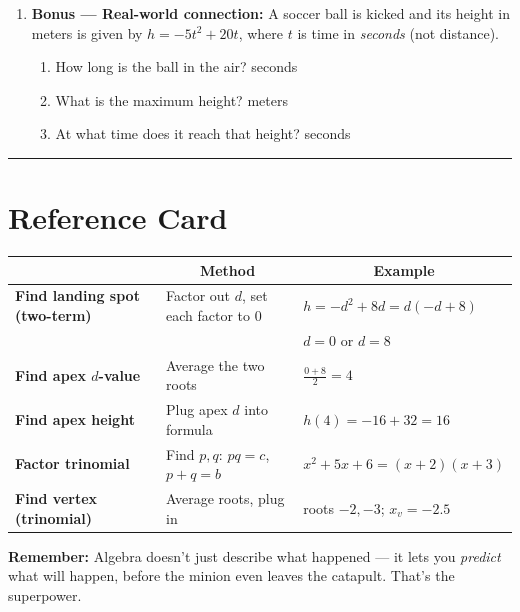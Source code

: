 \documentclass[12pt]{article}
\newcommand{\blank}[1][4cm]{\underline{\hspace{#1}}}
\begin{document}
\begin{enumerate}[leftmargin=*, label=\textbf{\arabic*.}, resume]
  \begin{workbox}
  \textit{Strategy: start from the roots, then figure out $A$ and $B$.}

  \vspace{3.5cm}
  My formula: $h = $ \blank[7cm]
  \end{workbox}

\vspace{8pt}
\item \textbf{Bonus --- Real-world connection:}
  A soccer ball is kicked and its height in meters is given by
  $h = -5t^2 + 20t$, where $t$ is time in \emph{seconds} (not distance).
  \begin{enumerate}[label=(\alph*)]
    \item How long is the ball in the air? \blank[3cm] seconds
    \vspace{4pt}
    \item What is the maximum height? \blank[3cm] meters
    \vspace{4pt}
    \item At what time does it reach that height? \blank[3cm] seconds
  \end{enumerate}

  \begin{workbox}
  \vspace{3cm}
  \end{workbox}

\end{enumerate}

\vspace{12pt}\noindent\rule{\linewidth}{1pt}
\section*{Reference Card}

\begin{center}
\renewcommand{\arraystretch}{1.6}
\begin{tabular}{|>{\bfseries}p{4.2cm}|p{5.2cm}|p{5cm}|}
\hline
\multicolumn{1}{|c|}{\textbf{Goal}} &
\multicolumn{1}{c|}{\textbf{Method}} &
\multicolumn{1}{c|}{\textbf{Example}} \\
\hline
Find landing spot (two-term) &
Factor out $d$, set each factor to 0 &
$h=-d^2+8d=d(-d+8)$\\
& & $d=0$ or $d=8$ \\
\hline
Find apex $d$-value &
Average the two roots &
$\frac{0+8}{2}=4$\\
\hline
Find apex height &
Plug apex $d$ into formula &
$h(4)=-16+32=16$ \\
\hline
Factor trinomial &
Find $p,q$: $pq=c$, $p+q=b$ &
$x^2+5x+6=(x+2)(x+3)$\\
\hline
Find vertex (trinomial) &
Average roots, plug in &
roots $-2,-3$; $x_v=-2.5$ \\
\hline
\end{tabular}
\end{center}

\vspace{10pt}
\begin{warningbox}
\textbf{Remember:} Algebra doesn't just describe what happened --- it lets
you \emph{predict} what will happen, before the minion even leaves the
catapult.  That's the superpower.
\end{warningbox}
\end{document}
